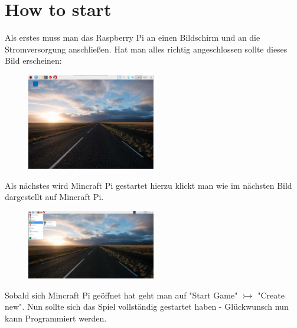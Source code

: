 \section{How to start}

Als erstes muss man das Raspberry Pi an einen Bildschirm und an die Stromversorgung anschließen. Hat man alles richtig angeschlossen sollte dieses Bild erscheinen:
\begin{figure}[H]
\includegraphics[width=0.5\textwidth]{Bilder/Raspi_Start_Bildschirm.png} %
\end{figure}
Als nächstes wird Mincraft Pi gestartet hierzu klickt man wie im nächsten Bild dargestellt auf Mincraft Pi.
\begin{figure}[H]
\includegraphics[width=0.5\textwidth]{Bilder/Raspi_Mincraft_Start.png} %
\end{figure}
Sobald sich Mincraft Pi geöffnet hat geht man auf "Start Game" $\rightarrowtail$ "Create new". Nun sollte sich das Spiel vollständig gestartet haben - Glückwunsch nun kann Programmiert werden.